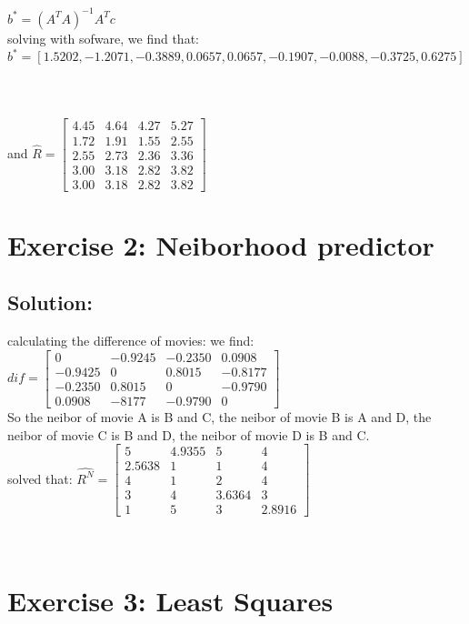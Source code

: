 \documentclass{article}
\begin{document}
{{$b^{*} = (A^TA)^{-1}A^Tc$\\
solving with sofware, we find that:\\ $b^*=[1.5202, -1.2071, -0.3889,  0.0657,  0.0657, -0.1907, -0.0088, -0.3725,  0.6275]$\\
~\\
~\\
~\\
and $ \hat{R} = \begin{bmatrix}
4.45&4.64&4.27&5.27\\
1.72&1.91&1.55&2.55\\
2.55&2.73&2.36&3.36\\
3.00&3.18&2.82&3.82\\
3.00&3.18&2.82&3.82
\end{bmatrix} $
~\\
\section*{Exercise 2: Neiborhood predictor}
\subsection*{Solution:}
calculating the difference of movies:
we find:\\
$dif = \begin{bmatrix}
0&-0.9245&-0.2350&0.0908\\
-0.9425&0&0.8015&-0.8177\\
-0.2350&0.8015&0&-0.9790\\
0.0908&-8177&-0.9790&0
\end{bmatrix}$\\
So the neibor of movie A is B and C, the neibor of movie B is A and D, the neibor of movie C is B and D, the neibor of movie D is B and C.\\
solved that: $\hat{R^N}=
\begin{bmatrix}
5&4.9355&5&4\\
2.5638&1&1&4\\
4&1&2&4\\
3&4&3.6364&3\\
1&5&3&2.8916
\end{bmatrix}$

\newpage
~\\
\section*{Exercise 3: Least Squares}
}}
\end{document}
